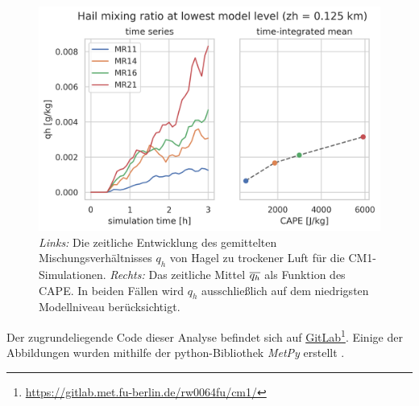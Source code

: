 \begin{figure}
	\centering
	\includegraphics[width=0.9\linewidth]{../figs/hail.png}
	\caption{\textit{Links:} Die zeitliche Entwicklung des gemittelten Mischungsverhältnisses \(q_h\) von Hagel zu trockener Luft für die CM1-Simulationen. \textit{Rechts:} Das zeitliche Mittel \(\overline{q_h}\) als Funktion des CAPE. In beiden Fällen wird \(q_h\) ausschließlich auf dem niedrigsten Modellniveau berücksichtigt.}
	\label{fig:hail}
\end{figure}

Der zugrundeliegende Code dieser Analyse befindet sich auf \href{https://gitlab.met.fu-berlin.de/rw0064fu/cm1/}{GitLab}\footnote{\hypersetup{urlcolor=}\url{https://gitlab.met.fu-berlin.de/rw0064fu/cm1/}}. Einige der Abbildungen wurden mithilfe der python-Bibliothek \textit{MetPy} erstellt \parencite{may2016}.